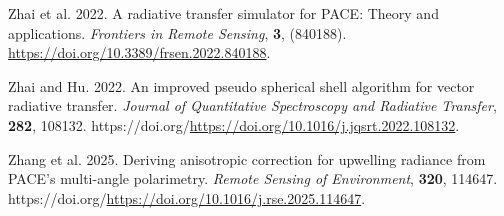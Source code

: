 \documentclass[
  11pt,
  letterpaper,
]{scrreprt}
\newlength{\cslhangindent}
\newenvironment{CSLReferences}[2] %
 {\begin{list}{}{%
  \setlength{\itemindent}{0pt}
  \setlength{\leftmargin}{0pt}
  \setlength{\parsep}{0pt}
  \ifodd #1
   \setlength{\leftmargin}{\cslhangindent}
   \setlength{\itemindent}{-1\cslhangindent}
  \fi
  \setlength{\itemsep}{#2\baselineskip}}}
 {\end{list}}
\begin{document}
\begin{CSLReferences}{1}{1}
Zhai et al. 2022. A radiative transfer simulator for PACE: Theory and
applications. \emph{Frontiers in Remote Sensing}, \textbf{3}, (840188).
\url{https://doi.org/10.3389/frsen.2022.840188}.

Zhai and Hu. 2022. An improved pseudo spherical shell algorithm for
vector radiative transfer. \emph{Journal of Quantitative Spectroscopy
and Radiative Transfer}, \textbf{282}, 108132.
https://doi.org/\url{https://doi.org/10.1016/j.jqsrt.2022.108132}.

Zhang et al. 2025. Deriving anisotropic correction for upwelling
radiance from PACE's multi-angle polarimetry. \emph{Remote Sensing of
Environment}, \textbf{320}, 114647.
https://doi.org/\url{https://doi.org/10.1016/j.rse.2025.114647}.

\end{CSLReferences}
\end{document}

